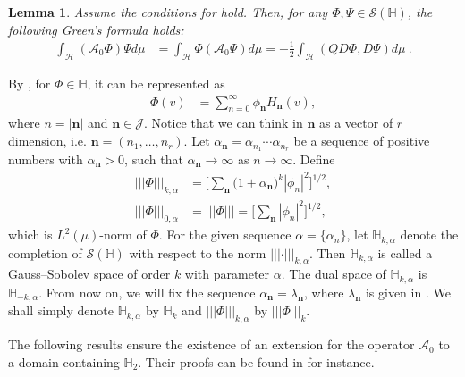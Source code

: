 \documentclass[]{interact}
\theoremstyle{plain}%
\newtheorem{lemma}[theorem]{Lemma}
\theoremstyle{definition}
\theoremstyle{remark}
\begin{document}
    \begin{lemma}
        Assume the conditions for   hold. Then, for any
        $\Phi,\Psi\in \mathcal{S}(\mathbb{H})$, the following Green’s formula 
        holds:
        \begin{align}
             \int_{\mathcal{H}} (\mathcal{A}_0 \Phi)\Psi d\mu &=
                 \int_{\mathcal{H}} \Phi(\mathcal{A}_0 \Psi) d\mu=
                -\frac{1}{2}\int_{\mathcal{H}} (QD\Phi, D\Psi) d\mu \ .
        \end{align}
    \end{lemma}

        By , for $\Phi \in \mathbb{H}$, it can be represented as
    \begin{align} \label{s1.4}
        \Phi(v) &=
            \sum_{n=0}^\infty \phi_{\mathbf{n}} H_{\mathbf{n}}(v),
    \end{align}
    where $n = |\mathbf{n}|$ and $\mathbf{n}\in \mathcal{J}$. Notice that we can
    think in $\mathbf{n}$ as a vector of $r$ dimension, i.e.
    $\mathbf{n}=(n_1,\ldots,n_r)$.
    Let $\alpha_{\mathbf{n}} = \alpha_{n_1}\cdots \alpha_{n_r}$ be a sequence of
    positive numbers with $\alpha_{\mathbf{n}} > 0$, such that
    $\alpha_{\mathbf{n}} \rightarrow \infty$ as $n \rightarrow \infty$.
    Define
    \begin{align*}
         |||\Phi|||_{k,\alpha} 
            &= \Bigg[ \sum_{\mathbf{n}}
            \big(
                1 + \alpha_{\mathbf{n}}
            \big) ^ k |\phi_n |^2 \Bigg]^{1/2} ,
        \\
        |||\Phi|||_{0,\alpha} 
            &= |||\Phi|||=\Bigg[ \sum_{\mathbf{n}} |\phi_n|^2
        \Bigg]^{1/2},
    \end{align*}
    which is $L^2(\mu)$-norm of $\Phi$. For the given sequence
    $\alpha = \{\alpha_n \}$, let $\mathbb{H}_{k,\alpha}$ denote
    the completion of $\mathcal{S}(\mathbb{H})$ with respect to the norm
    $|||\cdot|||_{k,\alpha}$. Then $\mathbb{H}_{k,\alpha}$ is called
    a Gauss–Sobolev space of order $k$ with parameter $\alpha$. The dual space 
    of $\mathbb{H}_{k,\alpha}$ is $\mathbb{H}_{-k,\alpha}$.
    From now on, we will fix the sequence $\alpha_{\mathbf{n}} =
    \lambda_{\mathbf{n}} $, where $\lambda_{\mathbf{n}} $ is given in
    . We shall simply denote $\mathbb{H}_{k,\alpha}$ by 
    $\mathbb{H}_{k}$ and
    $ |||\Phi|||_{k,\alpha}$ by $|||\Phi|||_{k}$.

        The following results ensure the existence of an extension for the 
    operator $\mathcal{A}_0$ to a domain containing $\mathbb{H}_{2}$. Their
    proofs can be found in \cite{liu} for instance.
\end{document}
